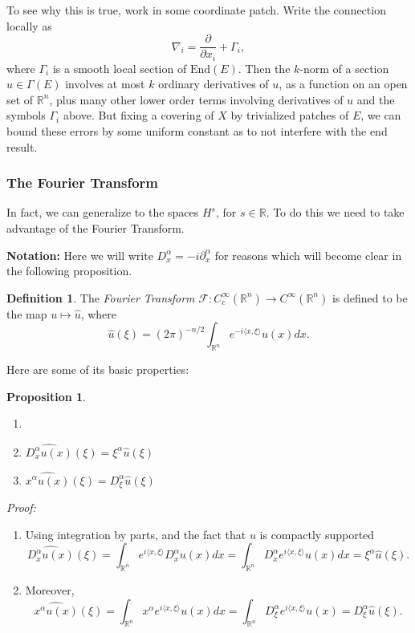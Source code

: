 \documentclass[14pt, reqno]{extarticle}
\theoremstyle{plain}
\newtheorem{proposition}{Proposition}[section]
\theoremstyle{definition}
\newtheorem{definition}{Definition}[section]
\theoremstyle{remark}
\newcommand{\RR}{\mathbb{R}}
\newcommand{\der}[2]{\frac{\partial #1}{\partial #2}}
\begin{document}
To see why this is true, work in some coordinate patch. Write the connection locally as
\[
    \nabla_i = \der{}{x_i} + \Gamma_i,
\]
where $\Gamma_i$ is a smooth local section of $\text{End}(E)$. Then the $k$-norm
of a section $u \in \Gamma(E)$ involves at most $k$ ordinary derivatives of $u$, 
as a function on an open set of $\RR^n$, plus many other lower order terms involving 
derivatives of $u$ and the symbols $\Gamma_i$ above. But fixing a covering 
of $X$ by trivialized patches of $E$, we can bound these errors by some uniform constant 
as to not interfere with the end result. 

\subsubsection{The Fourier Transform}

In fact, we can generalize to the spaces $H^s$, for $s \in \RR$. To do this we need 
to take advantage of the Fourier Transform.

\textbf{Notation:} Here we will write $D_x^\alpha = -i \partial_x^\alpha$ for reasons which will
become clear in the following proposition.

\begin{definition}
    The \textit{Fourier Transform} $\mathcal{F}: C_c^\infty(\RR^n) \to C^\infty(\RR^n)$ 
    is defined to be the map $u \mapsto \widehat{u}$, where
    \[
        \hat{u}(\xi) = (2\pi)^{-n/2} \int_{\RR^n} e^{-i\langle x, \xi\rangle}u(x)dx.
    \]
\end{definition}

Here are some of its basic properties:

\begin{proposition}
    \begin{enumerate} \item[]
        \item[1.] $\widehat{D_x^\alpha u(x)}(\xi) = \xi^\alpha \widehat{u}(\xi)$
        \item[2.] $\widehat{x^\alpha u(x)}(\xi) = D_\xi^\alpha \widehat{u}(\xi)$
    \end{enumerate}
\end{proposition}

\textit{Proof:} 
\begin{enumerate}
    \item Using integration by parts, and the fact that $u$ is compactly supported 
    \[
        \widehat{D_x^\alpha u(x)}(\xi) = \int_{\RR^n} e^{i\langle x, \xi\rangle} D_x^\alpha u(x) dx
        = \int_{\RR^n} D_x^\alpha e^{i\langle x, \xi\rangle} u(x)dx 
        = \xi^\alpha \widehat{u}(\xi).
    \]
    \item Moreover,
    \[
        \widehat{x^\alpha u(x)}(\xi) = \int_{\RR^n} x^\alpha e^{i\langle x,\xi\rangle}u(x)dx
        = \int_{\RR^n} D_\xi^\alpha e^{i\langle x,\xi\rangle} u(x) = D_\xi^\alpha \widehat{u}(\xi).
    \]
\end{enumerate}
\end{document}
